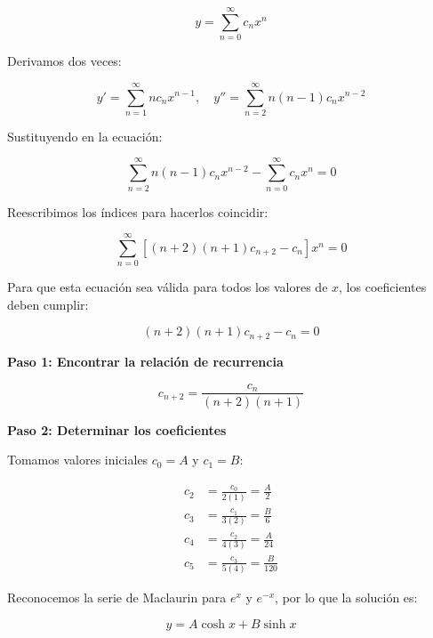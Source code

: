 \begin{equation}
y = \sum_{n=0}^{\infty} c_n x^n
\end{equation}

Derivamos dos veces:

\begin{equation}
y' = \sum_{n=1}^{\infty} n c_n x^{n-1}, \quad y'' = \sum_{n=2}^{\infty} n(n-1) c_n x^{n-2}
\end{equation}

Sustituyendo en la ecuación:

\begin{equation}
\sum_{n=2}^{\infty} n(n-1) c_n x^{n-2} - \sum_{n=0}^{\infty} c_n x^n = 0
\end{equation}

Reescribimos los índices para hacerlos coincidir:

\begin{equation}
\sum_{n=0}^{\infty} \left[ (n+2)(n+1) c_{n+2} - c_n \right] x^n = 0
\end{equation}

Para que esta ecuación sea válida para todos los valores de \( x \), los coeficientes deben cumplir:

\begin{equation}
(n+2)(n+1) c_{n+2} - c_n = 0
\end{equation}

\textbf{Paso 1: Encontrar la relación de recurrencia}

\begin{equation}
c_{n+2} = \frac{c_n}{(n+2)(n+1)}
\end{equation}

\textbf{Paso 2: Determinar los coeficientes}

Tomamos valores iniciales \( c_0 = A \) y \( c_1 = B \):

\begin{align*}
c_2 &= \frac{c_0}{2(1)} = \frac{A}{2} \\
c_3 &= \frac{c_1}{3(2)} = \frac{B}{6} \\
c_4 &= \frac{c_2}{4(3)} = \frac{A}{24} \\
c_5 &= \frac{c_3}{5(4)} = \frac{B}{120}
\end{align*}

Reconocemos la serie de Maclaurin para \( e^x \) y \( e^{-x} \), por lo que la solución es:

\begin{equation}
y = A \cosh x + B \sinh x
\end{equation}


